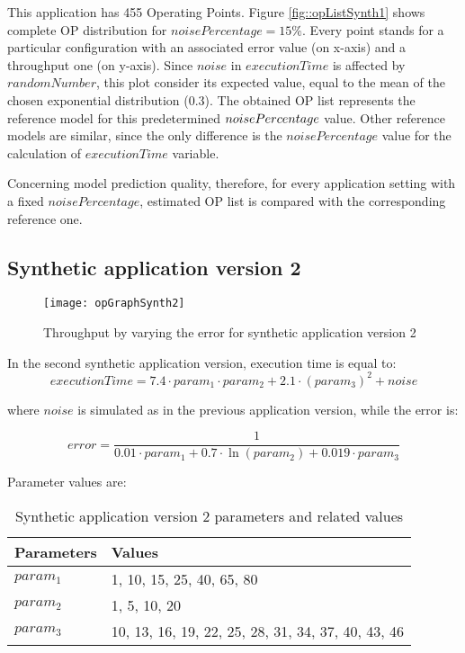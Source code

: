 This application has 455 Operating Points. Figure \ref{fig::opListSynth1} shows complete OP distribution for $noisePercentage = 15\%$. Every point stands for a particular configuration with an associated error value (on x-axis) and a throughput one (on y-axis). Since $noise$ in $executionTime$ is affected by $randomNumber$, this plot consider its expected value, equal to the mean of the chosen exponential distribution (0.3). The obtained OP list represents the reference model for this predetermined $noise\-Per\-cent\-age$ value. Other reference models are similar, since the only difference is the $noisePercentage$ value for the calculation of $executionTime$ variable.

Concerning model prediction quality, therefore, for every application setting with a fixed $noisePercentage$, estimated OP list is compared with the corresponding reference one.


\subsection{Synthetic application version 2}

\begin{figure}[h	]

    \centering
    \texttt{[image: opGraphSynth2]}

    \caption{Throughput by varying the error for synthetic application version 2}
 
   \label{fig::opListSynth2}
    
\end{figure}

In the second synthetic application version, execution time is equal to:
\[
executionTime = 7.4 \cdot param_1 \cdot param_2 + 2.1 \cdot (param_3)^2 + noise
\]

where $noise$ is simulated as in the previous application version, while the error is:

\[
error = \dfrac{1}{0.01 \cdot param_1 + 0.7 \cdot \ln{(param_2)} + 0.019 \cdot param_3}
\]

Parameter values are:

\begin{table}[H]

    \centering

    \begin{tabular}{ll}
    
        \toprule
        Parameters & Values \\
        \midrule
        $param_1$ & 1, 10, 15, 25, 40, 65, 80 \\
        $param_2$ & 1, 5, 10, 20 \\
        $param_3$ & 10, 13, 16, 19, 22, 25, 28, 31, 34, 37, 40, 43, 46 \\
        \bottomrule 
    
    \end{tabular}

    \caption{Synthetic application version 2 parameters and related values}

\end{table}

